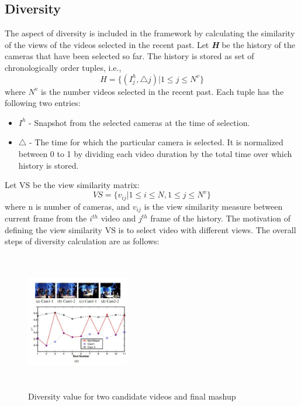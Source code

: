 \documentclass{sig-alternate}
\begin{document}
\subsection{Diversity}
The aspect of diversity is included in the framework by calculating the similarity of the views of the videos selected in the recent past. Let \textit{\textbf{H}} be the history of the cameras that have been selected so far. The history is stored as set of chronologically order tuples, i.e.,
\begin{equation}
H = {\{}(I^h_j , \triangle j)|1 \leq j \leq N^v  {\}}
\end{equation}  
where \(N^v\) is the number videos selected in the recent past. Each tuple has the following two entries: 
\begin{itemize}
\item  \(I^h\) - Snapshot from the selected cameras at the time of selection. 
\item  $\triangle$ - The time for which the particular camera is selected. It is normalized between 0 to 1 by dividing each video duration by the total time over which history is stored. 
\end{itemize}
Let VS be the view similarity matrix:
\begin{equation}
VS = {\{} v_{ij}|1 \leq i \leq N, 1 \leq j \leq N^v  {\}}
\end{equation}  
where n is number of cameras, and \(v_{ij}\) is the view similarity measure between current frame from the \(i^{th}\) video and \(j^{th}\) frame of the history. The motivation of defining the view similarity VS is to select video with different views. The overall steps of diversity calculation are as follows: 
 \begin{figure}[h]
\includegraphics[width=0.4\textwidth ,height = 6cm]{image5}
\caption{Diversity value for two candidate videos and ﬁnal mashup}
\label{fig:figure5}
\end{figure}
\end{document}
